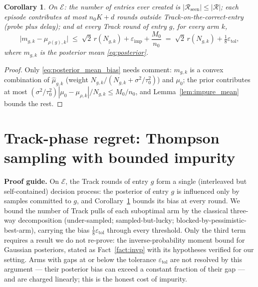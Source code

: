 \documentclass[11pt]{article}
\newtheorem{corollary}{Corollary}
\newcommand{\Ecal}{\mathcal E}
\newcommand{\Rcal}{\mathcal R}
\newcommand{\eimp}{\varepsilon_{\mathrm{imp}}}
\newcommand{\etol}{\varepsilon_{\mathrm{tol}}}
\newcommand{\proofguide}[1]{\par\smallskip\noindent\textcolor{blue!65!black}{\textbf{Proof guide.} #1}\par\smallskip}
\begin{document}
\begin{corollary}
\label{cor:structure}
On $\Ecal$: the number of entries ever created is $|\Rcal_{\mathrm{seen}}|\le|\Rcal|$; each episode contributes at most $n_0K+d$ rounds outside Track-on-the-correct-entry (probe plus delay); and at every Track round of entry $g$, for every arm $k$,
\begin{equation}
    \bigl|m_{g,k}-\mu_{\rho(g),k}\bigr|
    \;\le\;
    \sqrt2\,r(N_{g,k})+\eimp+\frac{M_0}{n_0}
    \;=\;
    \sqrt2\,r(N_{g,k})+\tfrac18\etol ,
    \label{eq:posterior_mean_bias}
\end{equation}
where $m_{g,k}$ is the posterior mean \eqref{eq:posterior}.
\end{corollary}

\begin{proof}
Only \eqref{eq:posterior_mean_bias} needs comment: $m_{g,k}$ is a convex combination of $\widehat\mu_{g,k}$ (weight $N_{g,k}/(N_{g,k}+\sigma^2/\tau_0^2)$) and $\mu_0$; the prior contributes at most $(\sigma^2/\tau_0^2)|\mu_0-\mu_{\rho,k}|/N_{g,k}\le M_0/n_0$, and Lemma~\ref{lem:impure_mean} bounds the rest.
\end{proof}

\section{Track-phase regret: Thompson sampling with bounded impurity}
\label{sec:track}

\proofguide{On $\Ecal$, the Track rounds of entry $g$ form a single (interleaved but self-contained) decision process: the posterior of entry $g$ is influenced only by samples committed to $g$, and Corollary~\ref{cor:structure} bounds its bias at every round. We bound the number of Track pulls of each suboptimal arm by the classical three-way decomposition (under-sampled; sampled-but-lucky; blocked-by-pessimistic-best-arm), carrying the bias $\tfrac18\etol$ through every threshold. Only the third term requires a result we do not re-prove: the inverse-probability moment bound for Gaussian posteriors, stated as Fact~\ref{fact:invp} with its hypotheses verified for our setting. Arms with gaps at or below the tolerance $\etol$ are not resolved by this argument --- their posterior bias can exceed a constant fraction of their gap --- and are charged linearly; this is the honest cost of impurity.}
\end{document}
